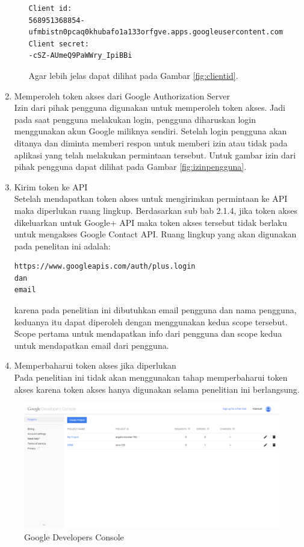 \begin{enumerate}[(1)]
\begin{enumerate}
\begin{lstlisting}[basicstyle=\footnotesize]
Client id:
568951368854-ufmbistn0pcaq0khubafo1a133orfgve.apps.googleusercontent.com
Client secret:
-cSZ-AUmeQ9PaWWry_IpiBBi
\end{lstlisting}
Agar lebih jelas dapat dilihat pada Gambar \ref{fig:clientid}.
    \end{enumerate}
\item Memperoleh token akses dari Google Authorization Server\\
Izin dari pihak pengguna digunakan untuk memperoleh token akses. Jadi pada saat pengguna melakukan login, pengguna diharuskan login menggunakan akun Google miliknya sendiri. Setelah login pengguna akan ditanya dan diminta memberi respon untuk memberi izin atau tidak pada aplikasi yang telah melakukan permintaan tersebut. Untuk gambar izin dari pihak pengguna dapat dilihat pada Gambar \ref{fig:izinpengguna}.
\item Kirim token ke API\\
Setelah mendapatkan token akses untuk mengirimkan permintaan ke API maka diperlukan ruang lingkup. Berdasarkan sub bab 2.1.4, jika token akses dikeluarkan untuk Google+ API maka token akses tersebut tidak berlaku untuk mengakses Google Contact API. Ruang lingkup yang akan digunakan pada penelitan ini adalah:
\begin{lstlisting}[basicstyle=\footnotesize]
https://www.googleapis.com/auth/plus.login
dan
email
\end{lstlisting}
karena pada penelitian ini dibutuhkan email pengguna dan nama pengguna, keduanya itu dapat diperoleh dengan menggunakan kedua scope tersebut. Scope pertama untuk mendapatkan info dari pengguna dan scope kedua untuk mendapatkan email dari pengguna.
\item Memperbaharui token akses jika diperlukan\\
Pada penelitian ini tidak akan menggunakan tahap memperbaharui token akses
karena token akses hanya digunakan selama penelitian ini berlangsung.
\end{enumerate}

\begin{figure}[p]
\centering
\includegraphics[scale=0.4]{Gambar/GDC.png}
\caption[Google Developers Console]{Google Developers Console} 
\label{fig:gdc}
\end{figure}

